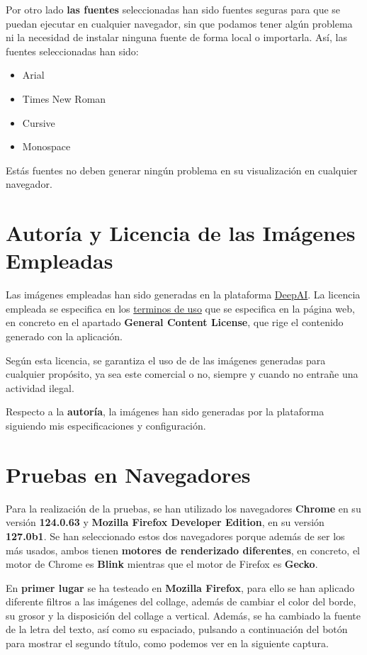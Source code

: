 Por otro lado \textbf{las fuentes} seleccionadas han sido fuentes seguras para que se puedan ejecutar en cualquier navegador, sin que podamos tener algún problema ni la necesidad de instalar ninguna fuente de forma local o importarla. Así, las fuentes seleccionadas han sido:

\begin{itemize}
    \item Arial
    \item Times New Roman
    \item Cursive
    \item Monospace
\end{itemize}

Estás fuentes no deben generar ningún problema en su visualización en cualquier navegador.

\section{Autoría y Licencia de las Imágenes Empleadas}
Las imágenes empleadas han sido generadas en la plataforma \href{https://deepai.org/}{DeepAI}. La licencia empleada se especifica en los \href{https://deepai.org/terms-of-service/terms-of-service}{terminos de uso} que se especifica en la página web, en concreto en el apartado \textbf{General Content License}, que rige el contenido generado con la aplicación.

Según esta licencia, se garantiza el uso de de las imágenes generadas para cualquier propósito, ya sea este comercial o no, siempre y cuando no entrañe una actividad ilegal.

Respecto a la \textbf{autoría}, la imágenes han sido generadas por la plataforma siguiendo mis especificaciones y configuración.

\section{Pruebas en Navegadores}
Para la realización de la pruebas, se han utilizado los navegadores \textbf{Chrome} en su versión \textbf{124.0.63} y \textbf{Mozilla Firefox Developer Edition}, en su versión \textbf{127.0b1}. Se han seleccionado estos dos navegadores porque además de ser los más usados, ambos tienen \textbf{motores de renderizado diferentes}, en concreto, el motor de Chrome es \textbf{Blink} mientras que el motor de Firefox es \textbf{Gecko}.

En \textbf{primer lugar} se ha testeado en \textbf{Mozilla Firefox}, para ello se han aplicado diferente filtros a las imágenes del collage, además de cambiar el color del borde, su grosor y la disposición del collage a vertical. Además, se ha cambiado la fuente de la letra del texto, así como su espaciado, pulsando a continuación del botón para mostrar el segundo título, como podemos ver en la siguiente captura.

